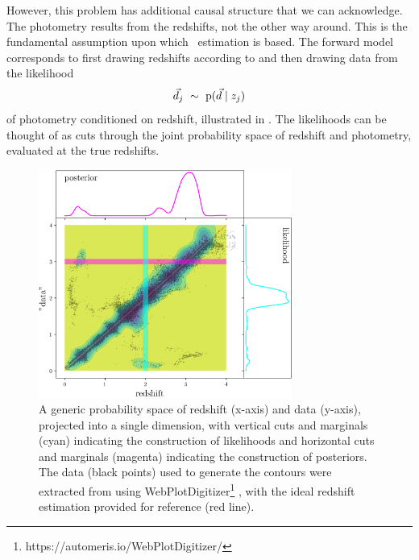 However, this problem has additional causal structure that we can acknowledge.
The photometry results from the redshifts, not the other way around.
This is the fundamental assumption upon which \pz\ estimation is based.
The forward model corresponds to first drawing redshifts according to  and then drawing data from the likelihood
\begin{equation}
\eqlabel{eqn:pzpdf}
\data_{j}\ \sim\ \pr{\data \gvn z_{j}}
\end{equation}
of photometry conditioned on redshift, illustrated in .
The likelihoods can be thought of as cuts through the joint probability space of redshift and photometry, evaluated at the true redshifts.

\begin{figure}
	\begin{center}
		\includegraphics[width=0.74\textwidth]{figures/chippr/jain05.png}
		\caption{
			A generic probability space of redshift (x-axis) and data (y-axis), projected into a single dimension, with vertical cuts and marginals (cyan) indicating the construction of likelihoods and horizontal cuts and marginals (magenta) indicating the construction of posteriors.
			The data (black points) used to generate the contours were extracted from \citet{jain_whole_2015} using WebPlotDigitizer\footnote{https://automeris.io/WebPlotDigitizer/} \citep{rohatgi_webplotdigitizer_2019}, with the ideal redshift estimation provided for reference (red line).
		}
	\end{center}
\end{figure}

